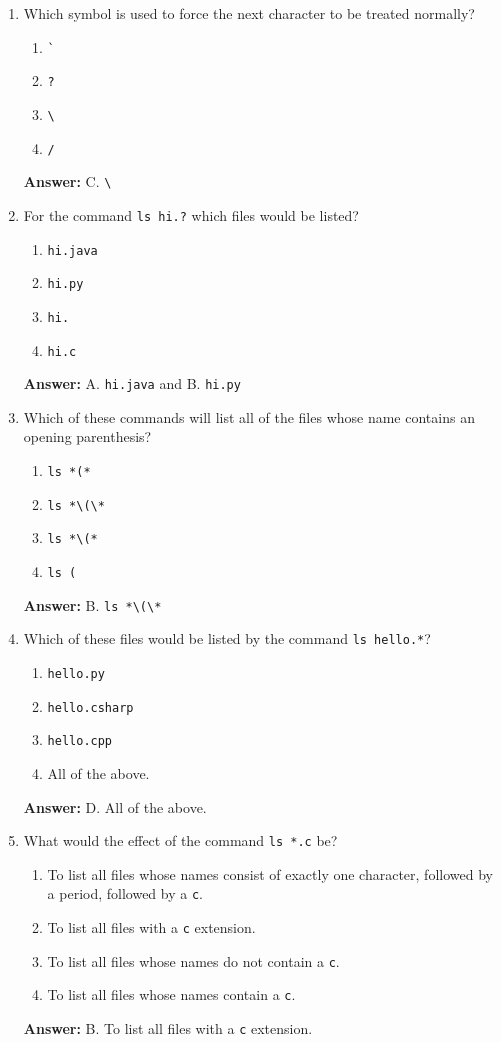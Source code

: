 \documentclass{article}
\begin{document}
\begin{enumerate}
    \item Which symbol is used to force the next character to be treated normally?
    \begin{enumerate}
        \item \verb|`|
        \item \verb|?|
        \item \verb|\|
        \item \verb|/|
    \end{enumerate}
    \textbf{Answer:} C. \verb|\|

    \item For the command \verb|ls hi.?| which files would be listed?
    \begin{enumerate}
        \item \verb|hi.java|
        \item \verb|hi.py|
        \item \verb|hi.|
        \item \verb|hi.c|
    \end{enumerate}
    \textbf{Answer:} A. \verb|hi.java| and B. \verb|hi.py|

    \item Which of these commands will list all of the files whose name contains an opening parenthesis?
    \begin{enumerate}
        \item \verb|ls *(*|
        \item \verb|ls *\(\*|
        \item \verb|ls *\(*|
        \item \verb|ls (|
    \end{enumerate}
    \textbf{Answer:} B. \verb|ls *\(\*|

    \item Which of these files would be listed by the command \verb|ls hello.*|?
    \begin{enumerate}
        \item \verb|hello.py|
        \item \verb|hello.csharp|
        \item \verb|hello.cpp|
        \item All of the above.
    \end{enumerate}
    \textbf{Answer:} D. All of the above.

    \item What would the effect of the command \verb|ls *.c| be?
    \begin{enumerate}
        \item To list all files whose names consist of exactly one character, followed by a period, followed by a \verb|c|.
        \item To list all files with a \verb|c| extension.
        \item To list all files whose names do not contain a \verb|c|.
        \item To list all files whose names contain a \verb|c|.
    \end{enumerate}
    \textbf{Answer:} B. To list all files with a \verb|c| extension.


\end{enumerate}
\end{document}
